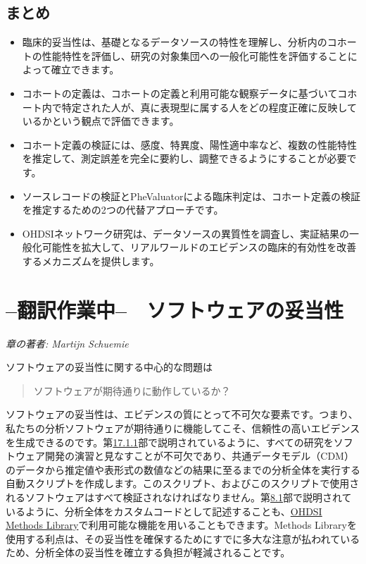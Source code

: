 \documentclass[
  11pt]{book}
\makeatletter
\providecommand{\tightlist}{%
  \setlength{\itemsep}{0pt}\setlength{\parskip}{0pt}}
\newenvironment{kframe}{%
\medskip{}
\setlength{\fboxsep}{.8em}
 \def\at@end@of@kframe{}%
 \ifinner\ifhmode%
  \def\at@end@of@kframe{\end{minipage}}%
  \begin{minipage}{\columnwidth}%
 \fi\fi%
 \def\FrameCommand##1{\hskip\@totalleftmargin \hskip-\fboxsep
 \colorbox{myShadeColor}{##1}\hskip-\fboxsep
     \hskip-\linewidth \hskip-\@totalleftmargin \hskip\columnwidth}%
 \MakeFramed {\advance\hsize-\width
   \@totalleftmargin\z@ \linewidth\hsize
   \@setminipage}}%
 {\par\unskip\endMakeFramed%
 \at@end@of@kframe}
\newenvironment{rmdblock}[1]
  {
  \begin{itemize}
  \renewcommand{\labelitemi}{
    \raisebox{-.7\height}[0pt][0pt]{
      {\setkeys{Gin}{width=3em,keepaspectratio}\texttt{[image: images/\#1]}}
    }
  }
  \setlength{\fboxsep}{1em}
  \begin{kframe}
  \item
  }
  {
  \end{kframe}
  \end{itemize}
  }
\newenvironment{rmdsummary}
  {\begin{rmdblock}{summary}}
  {\end{rmdblock}}
\theoremstyle{definition}
\theoremstyle{definition}
\theoremstyle{definition}
\theoremstyle{definition}
\theoremstyle{remark}
\makeatother
\begin{document}
\section{まとめ}\label{ux307eux3068ux3081-13}

\begin{rmdsummary}
\begin{itemize}
\tightlist
\item
  臨床的妥当性は、基礎となるデータソースの特性を理解し、分析内のコホートの性能特性を評価し、研究の対象集団への一般化可能性を評価することによって確立できます。
\item
  コホートの定義は、コホートの定義と利用可能な観察データに基づいてコホート内で特定された人が、真に表現型に属する人をどの程度正確に反映しているかという観点で評価できます。
\item
  コホート定義の検証には、感度、特異度、陽性適中率など、複数の性能特性を推定して、測定誤差を完全に要約し、調整できるようにすることが必要です。
\item
  ソースレコードの検証とPheValuatorによる臨床判定は、コホート定義の検証を推定するための2つの代替アプローチです。
\item
  OHDSIネットワーク研究は、データソースの異質性を調査し、実証結果の一般化可能性を拡大して、リアルワールドのエビデンスの臨床的有効性を改善するメカニズムを提供します。
\end{itemize}
\end{rmdsummary}

\chapter{--翻訳作業中--　ソフトウェアの妥当性}\label{SoftwareValidity}

\emph{章の著者: Martijn Schuemie}

ソフトウェアの妥当性に関する中心的な問題は

\begin{quote}
ソフトウェアが期待通りに動作しているか？
\end{quote}

ソフトウェアの妥当性は、エビデンスの質にとって不可欠な要素です。つまり、私たちの分析ソフトウェアが期待通りに機能してこそ、信頼性の高いエビデンスを生成できるのです。第\href{https://ohdsi.github.io/TheBookOfOhdsi/SoftwareValidity.html\#automation}{17.1.1}部で説明されているように、すべての研究をソフトウェア開発の演習と見なすことが不可欠であり、共通データモデル（CDM）のデータから推定値や表形式の数値などの結果に至るまでの分析全体を実行する自動スクリプトを作成します。このスクリプト、およびこのスクリプトで使用されるソフトウェアはすべて検証されなければなりません。第\href{https://ohdsi.github.io/TheBookOfOhdsi/OhdsiAnalyticsTools.html\#analysisImplementation}{8.1}部で説明されているように、分析全体をカスタムコードとして記述することも、\href{https://ohdsi.github.io/MethodsLibrary/}{OHDSI Methods Library}で利用可能な機能を用いることもできます。Methods Libraryを使用する利点は、その妥当性を確保するためにすでに多大な注意が払われているため、分析全体の妥当性を確立する負担が軽減されることです。
\end{document}
